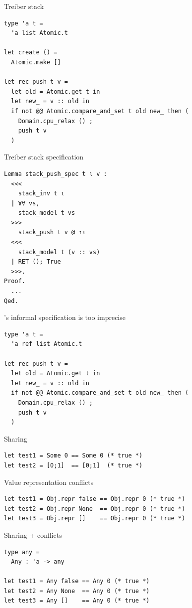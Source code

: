 \begin{frame}[fragile]{Treiber stack}
\large
\begin{verbatim}
type 'a t =
  'a list Atomic.t

let create () =
  Atomic.make []

let rec push t v =
  let old = Atomic.get t in
  let new_ = v :: old in
  if not @@ Atomic.compare_and_set t old new_ then (
    Domain.cpu_relax () ;
    push t v
  )
\end{verbatim}
\end{frame}

\begin{frame}[fragile]{Treiber stack specification}
\large
\begin{verbatim}
Lemma stack_push_spec t ι v :
  <<< 
    stack_inv t ι
  | ∀∀ vs,
    stack_model t vs 
  >>>
    stack_push t v @ ↑ι
  <<<
    stack_model t (v :: vs)
  | RET (); True
  >>>.
Proof.
  ...
Qed.
\end{verbatim}
\end{frame}

\begin{frame}[fragile]{\OCaml's informal specification is too imprecise}
\Large
\begin{verbatim}
type 'a t =
  'a ref list Atomic.t

let rec push t v =
  let old = Atomic.get t in
  let new_ = v :: old in
  if not @@ Atomic.compare_and_set t old new_ then (
    Domain.cpu_relax () ;
    push t v
  )
\end{verbatim}
\end{frame}

\begin{frame}[fragile]{Sharing}
\Large
\begin{verbatim}
let test1 = Some 0 == Some 0 (* true *)
let test2 = [0;1]  == [0;1]  (* true *)
\end{verbatim}
\end{frame}

\begin{frame}[fragile]{Value representation conflicts}
\Large
\begin{verbatim}
let test1 = Obj.repr false == Obj.repr 0 (* true *)
let test2 = Obj.repr None  == Obj.repr 0 (* true *)
let test3 = Obj.repr []    == Obj.repr 0 (* true *)
\end{verbatim}
\end{frame}

\begin{frame}[fragile]{Sharing + conflicts}
\Large
\begin{verbatim}
type any =
  Any : 'a -> any

let test1 = Any false == Any 0 (* true *)
let test2 = Any None  == Any 0 (* true *)
let test3 = Any []    == Any 0 (* true *)
\end{verbatim}
\end{frame}

